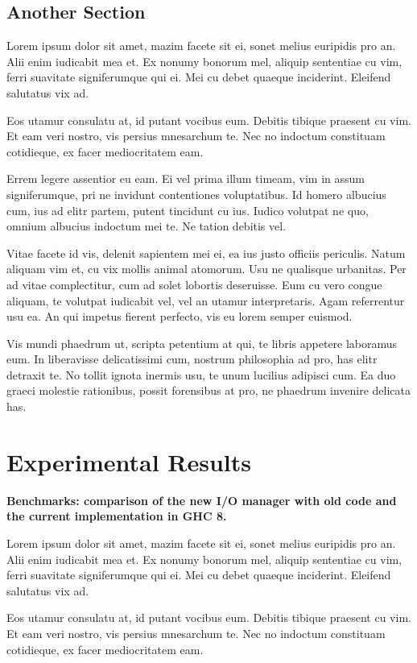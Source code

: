 \documentclass[a4paper,11pt,oneside]{report}
\begin{document}
\section{Another Section}

Lorem ipsum dolor sit amet, mazim facete sit ei, sonet melius euripidis pro
an. Alii enim iudicabit mea et. Ex nonumy bonorum mel, aliquip sententiae cu
vim, ferri suavitate signiferumque qui ei. Mei cu debet quaeque
inciderint. Eleifend salutatus vix ad.

Eos utamur consulatu at, id putant vocibus eum. Debitis tibique praesent cu
vim. Et eam veri nostro, vis persius mnesarchum te. Nec no indoctum constituam
cotidieque, ex facer mediocritatem eam.

Errem legere assentior eu eam. Ei vel prima illum timeam, vim in assum
signiferumque, pri ne invidunt contentiones voluptatibus. Id homero albucius
cum, ius ad elitr partem, putent tincidunt cu ius. Iudico volutpat ne quo,
omnium albucius indoctum mei te. Ne tation debitis vel.

Vitae facete id vis, delenit sapientem mei ei, ea ius justo officiis
periculis. Natum aliquam vim et, cu vix mollis animal atomorum. Usu ne qualisque
urbanitas. Per ad vitae complectitur, cum ad solet lobortis deseruisse. Eum cu
vero congue aliquam, te volutpat iudicabit vel, vel an utamur
interpretaris. Agam referrentur usu ea. An qui impetus fierent perfecto, vis eu
lorem semper euismod.

Vis mundi phaedrum ut, scripta petentium at qui, te libris appetere laboramus
eum. In liberavisse delicatissimi cum, nostrum philosophia ad pro, has elitr
detraxit te. No tollit ignota inermis usu, te unum lucilius adipisci cum. Ea duo
graeci molestie rationibus, possit forensibus at pro, ne phaedrum invenire
delicata has.

\chapter{Experimental Results}

\textbf{Benchmarks: comparison of the new I/O manager with old code and the
  current implementation in GHC 8.}

Lorem ipsum dolor sit amet, mazim facete sit ei, sonet melius euripidis pro
an. Alii enim iudicabit mea et. Ex nonumy bonorum mel, aliquip sententiae cu
vim, ferri suavitate signiferumque qui ei. Mei cu debet quaeque
inciderint. Eleifend salutatus vix ad.

Eos utamur consulatu at, id putant vocibus eum. Debitis tibique praesent cu
vim. Et eam veri nostro, vis persius mnesarchum te. Nec no indoctum constituam
cotidieque, ex facer mediocritatem eam.
\end{document}
